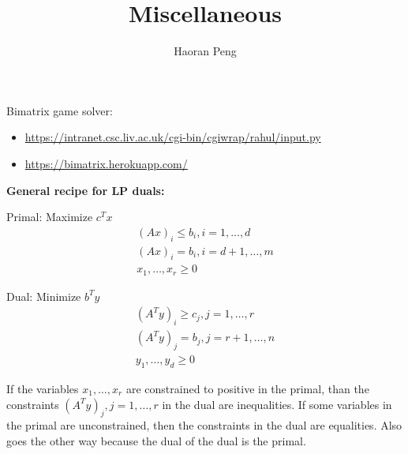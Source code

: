 \documentclass{article}
\begin{document}
	\title{Miscellaneous}
	\author{Haoran Peng}
	\maketitle
Bimatrix game solver: 
\begin{itemize}
\item \url{https://intranet.csc.liv.ac.uk/cgi-bin/cgiwrap/rahul/input.py}
\item \url{https://bimatrix.herokuapp.com/}
\end{itemize}
\textbf{General recipe for LP duals: }

\begin{minipage}{0.5\textwidth}
Primal: Maximize $c^Tx$
\begin{align*}
(Ax)_i \le b_i, i = 1,\ldots, d\\
(Ax)_i = b_i, i = d+1,\ldots, m\\
x_1, \ldots, x_r \ge0
\end{align*}
\end{minipage}
\begin{minipage}{0.5\textwidth}
Dual: Minimize $b^Ty$
\begin{align*}
	(A^Ty)_i \ge c_j, j = 1,\ldots, r\\
	(A^Ty)_j = b_j, j = r+1,\ldots, n\\
	y_1, \ldots, y_d \ge0
\end{align*}
\end{minipage}
If the variables $x_1,\ldots, x_r$ are constrained to positive in the primal, than the constraints $(A^Ty)_j, j = 1,\ldots,r$ in the dual are inequalities. If some variables in the primal are unconstrained, then the constraints in the dual are equalities. Also goes the other way because the dual of the dual is the primal.
\end{document}
